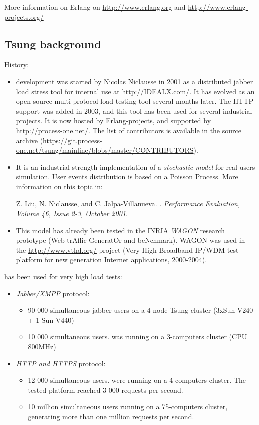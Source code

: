 \documentclass{TSUNG-en}
\begin{document}
More information on Erlang on \url{http://www.erlang.org} and
\url{http://www.erlang-projects.org/}


\subsection{Tsung background}

History:
\begin{itemize}
\item {} development was started by Nicolas Niclausse in
  2001 as a distributed jabber load stress tool for internal use at
  \url{http://IDEALX.com/}.  It has evolved as an open-source
  multi-protocol load testing tool several months later. The HTTP
  support was added in 2003, and this tool has been used for several
  industrial projects.  It is now hosted by Erlang-projects, and
  supported by \url{http://process-one.net/}. The list of contributors
  is available in the source archive
  (\url{https://git.process-one.net/tsung/mainline/blobs/master/CONTRIBUTORS}).

\item It is an industrial strength implementation of a \emph{stochastic model}
for real users simulation. User events distribution is based on a
Poisson Process. More information on this topic in:

Z. Liu, N. Niclausse, and C. Jalpa-Villanueva.  . \emph{Performance Evaluation,
Volume 46, Issue 2-3, October 2001}.

\item This model has already been tested in the INRIA \emph{WAGON}
  research prototype (Web trAffic GeneratOr and beNchmark). WAGON was
  used in the \url{http://www.vthd.org/} project (Very High Broadband
  IP/WDM test platform for new generation Internet applications, 2000-2004).

\end{itemize}

 has been used for very high load tests:

\begin{itemize}
\item \emph{Jabber/XMPP} protocol:
  \begin{itemize}
  \item 90 000 simultaneous jabber users on a
  4-node Tsung cluster (3xSun V240 + 1 Sun V440)
\item 10 000 simultaneous users.
   was running on a 3-computers cluster (CPU
  800MHz)
  \end{itemize}
\item \emph{HTTP and HTTPS} protocol:
  \begin{itemize}
  \item 12 000 simultaneous users.
   were running on a 4-computers cluster. The
  tested platform reached 3 000 requests per second.
 \item 10 million simultaneous users running on a 75-computers cluster,
  generating more than one million requests per second.
  \end{itemize}
\end{itemize}
\end{document}
